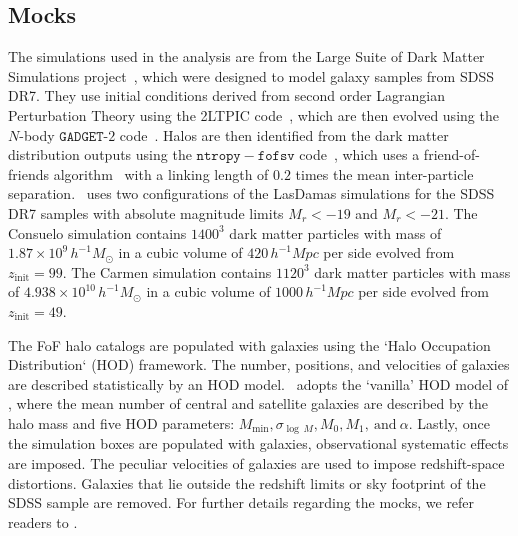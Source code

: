 \documentclass[12pt, letterpaper, preprint]{aastex}
\newcommand{\Sinh}{\citetalias{sinha2017}}
\begin{document}
\subsection{\cite{sinha2017} Mocks} \label{sec:gmf} 
The simulations used in the \cite{sinha2017} analysis are from the
Large Suite of Dark Matter Simulations project~\citep[LasDamas;][]{mcbride2009}, 
which were designed to model galaxy samples from SDSS DR7. They use 
initial conditions derived from second order Lagrangian Perturbation 
Theory using the 2LTPIC code~\citep{scoccimarro1998, crocce2006}, 
which are then evolved using the $N$-body $\mathtt{GADGET}$-$2$ code~\citep{springel2005}.
Halos are then identified from the dark matter distribution outputs using 
the $\mathtt{ntropy-fofsv}$ code~\citep{gardner2007}, which uses a 
friend-of-friends algorithm~\citep[FoF;][]{davis1985} with a linking length of $0.2$
times the mean inter-particle separation. %
\Sinh~uses two configurations of the LasDamas simulations for the 
SDSS DR7 samples with absolute magnitude limits $M_r < -19$ and $M_r < -21$.
The Consuelo simulation contains $1400^3$ dark matter particles with 
mass of $1.87 \times 10^9\,h^{-1} M_\odot$ in a cubic volume of 
$420\,h^{-1} Mpc$ per side evolved from $z_\mathrm{init} = 99$. 
The Carmen simulation contains $1120^3$ dark matter particles with mass 
of $4.938 \times 10^{10}\,h^{-1} M_\odot$ in a cubic volume of 
$1000\,h^{-1} Mpc$ per side evolved from $z_\mathrm{init} = 49$. 

The FoF halo catalogs are populated with galaxies using the 
`Halo Occupation Distribution` (HOD) framework. The 
number, positions, and velocities of galaxies are described statistically 
by an HOD model. \Sinh~adopts the `vanilla' HOD model of \cite{zheng2007}, 
where the mean number of central and satellite galaxies are described by 
the halo mass and five HOD parameters: $M_\mathrm{min}, 
\sigma_{\log\,M} , M_0, M_1,~\mathrm{and}~\alpha$. Lastly, once the 
simulation boxes are populated with galaxies, observational systematic 
effects are imposed. The peculiar velocities of galaxies are used to 
impose redshift-space distortions. Galaxies that lie outside the redshift
limits or sky footprint of the SDSS sample are removed. For further 
details regarding the mocks, we refer readers to \Sinh.
\end{document}
